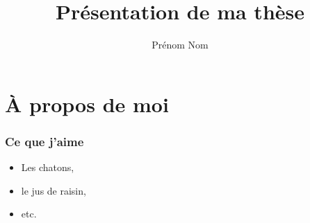\documentclass{beamer}
\title{Présentation de ma thèse}
\author{Prénom Nom}
\institute[LDC]{Laboratoire des Chatons}
\begin{document}
\begin{frame}
  \maketitle
\end{frame}


\section{À propos de moi}

\begin{frame}
  \frametitle{Ce que j'aime}
  \begin{itemize}
    \item Les chatons,
    \pause
    \item le jus de raisin,
    \pause
    \item etc.
  \end{itemize}
\end{frame}
\end{document}
